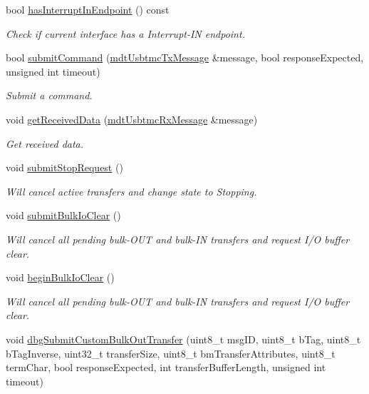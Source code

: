 \begin{DoxyCompactItemize}
bool \hyperlink{classmdt_usbtmc_transfer_handler_ab8206aff7c466babcd308cce1c62c7ae}{has\-Interrupt\-In\-Endpoint} () const 
\begin{DoxyCompactList}\small\item\em Check if current interface has a Interrupt-\/\-I\-N endpoint. \end{DoxyCompactList}\item 
bool \hyperlink{classmdt_usbtmc_transfer_handler_a2ba256326fc2b6ca70816eb1cca783c9}{submit\-Command} (\hyperlink{classmdt_usbtmc_tx_message}{mdt\-Usbtmc\-Tx\-Message} \&message, bool response\-Expected, unsigned int timeout)
\begin{DoxyCompactList}\small\item\em Submit a command. \end{DoxyCompactList}\item 
void \hyperlink{classmdt_usbtmc_transfer_handler_aaa348472836fed8674266a81b0a9e0f4}{get\-Received\-Data} (\hyperlink{classmdt_usbtmc_rx_message}{mdt\-Usbtmc\-Rx\-Message} \&message)
\begin{DoxyCompactList}\small\item\em Get received data. \end{DoxyCompactList}\item 
void \hyperlink{classmdt_usbtmc_transfer_handler_acc1a517f0dd53740ed12264d713d137f}{submit\-Stop\-Request} ()
\begin{DoxyCompactList}\small\item\em Will cancel active transfers and change state to Stopping. \end{DoxyCompactList}\item 
void \hyperlink{classmdt_usbtmc_transfer_handler_ac39c042193f7705c80c738dbf109a8b2}{submit\-Bulk\-Io\-Clear} ()
\begin{DoxyCompactList}\small\item\em Will cancel all pending bulk-\/\-O\-U\-T and bulk-\/\-I\-N transfers and request I/\-O buffer clear. \end{DoxyCompactList}\item 
void \hyperlink{classmdt_usbtmc_transfer_handler_ae32000426c4f8d3c6cd0a833212fdbfd}{begin\-Bulk\-Io\-Clear} ()
\begin{DoxyCompactList}\small\item\em Will cancel all pending bulk-\/\-O\-U\-T and bulk-\/\-I\-N transfers and request I/\-O buffer clear. \end{DoxyCompactList}\item 
void \hyperlink{classmdt_usbtmc_transfer_handler_a363680942d26a4f94cd710ca859f49cc}{dbg\-Submit\-Custom\-Bulk\-Out\-Transfer} (uint8\-\_\-t msg\-I\-D, uint8\-\_\-t b\-Tag, uint8\-\_\-t b\-Tag\-Inverse, uint32\-\_\-t transfer\-Size, uint8\-\_\-t bm\-Transfer\-Attributes, uint8\-\_\-t term\-Char, bool response\-Expected, int transfer\-Buffer\-Length, unsigned int timeout)

\end{DoxyCompactItemize}
